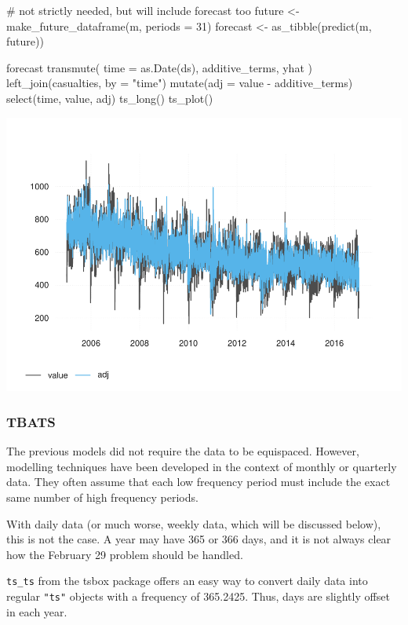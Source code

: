 \begin{Schunk}
\begin{Sinput}
# not strictly needed, but will include forecast too
future <- make_future_dataframe(m, periods = 31)
forecast <- as_tibble(predict(m, future))

forecast %
  transmute(
    time = as.Date(ds),
    additive_terms,
    yhat
  ) %
  left_join(casualties, by = "time") %
  mutate(adj = value - additive_terms) %
  select(time, value, adj) %
  ts_long() %
  ts_plot()
\end{Sinput}

\includegraphics[width=1\linewidth]{overview_files/figure-latex/prophet-components-1} \end{Schunk}

\hypertarget{tbats}{%
\subsubsection{TBATS}\label{tbats}}

The previous models did not require the data to be equispaced. However,
modelling techniques have been developed in the context of monthly or
quarterly data. They often assume that each low frequency period must
include the exact same number of high frequency periods.

With daily data (or much worse, weekly data, which will be discussed
below), this is not the case. A year may have 365 or 366 days, and it is
not always clear how the February 29 problem should be handled.

\texttt{ts\_ts} from the tsbox package offers an easy way to convert
daily data into regular \texttt{"ts"} objects with a frequency of
365.2425. Thus, days are slightly offset in each year.

